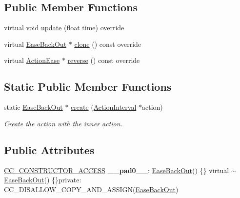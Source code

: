 \subsection*{Public Member Functions}
\begin{DoxyCompactItemize}
\item 
virtual void \hyperlink{classEaseBackOut_a458a06e1b120e51c52a4687ced84f757}{update} (float time) override
\item 
virtual \hyperlink{classEaseBackOut}{Ease\+Back\+Out} $\ast$ \hyperlink{classEaseBackOut_a76c84f18730150e2705b95f9678ad8c7}{clone} () const override
\item 
virtual \hyperlink{classActionEase}{Action\+Ease} $\ast$ \hyperlink{classEaseBackOut_acf37a76a71da70fd233dd28934332316}{reverse} () const override
\end{DoxyCompactItemize}
\subsection*{Static Public Member Functions}
\begin{DoxyCompactItemize}
\item 
static \hyperlink{classEaseBackOut}{Ease\+Back\+Out} $\ast$ \hyperlink{classEaseBackOut_a7c338d0e6d2d20285d51acb0beed81bd}{create} (\hyperlink{classActionInterval}{Action\+Interval} $\ast$action)
\begin{DoxyCompactList}\small\item\em Create the action with the inner action. \end{DoxyCompactList}\end{DoxyCompactItemize}
\subsection*{Public Attributes}
\begin{DoxyCompactItemize}
\item 
\mbox{\label{classEaseBackOut_af786febf440e30e64980fec2a9d0929e}} 
\hyperlink{_2cocos2d_2cocos_2base_2ccConfig_8h_a25ef1314f97c35a2ed3d029b0ead6da0}{C\+C\+\_\+\+C\+O\+N\+S\+T\+R\+U\+C\+T\+O\+R\+\_\+\+A\+C\+C\+E\+SS} {\bfseries \+\_\+\+\_\+pad0\+\_\+\+\_\+}\+: \hyperlink{classEaseBackOut}{Ease\+Back\+Out}() \{\} virtual $\sim$\hyperlink{classEaseBackOut}{Ease\+Back\+Out}() \{\}private\+: C\+C\+\_\+\+D\+I\+S\+A\+L\+L\+O\+W\+\_\+\+C\+O\+P\+Y\+\_\+\+A\+N\+D\+\_\+\+A\+S\+S\+I\+GN(\hyperlink{classEaseBackOut}{Ease\+Back\+Out})
\end{DoxyCompactItemize}
